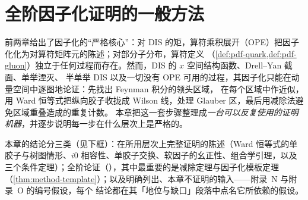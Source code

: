 \chapter{全阶因子化证明的一般方法}\label{ch:method}

前两章给出了因子化的“严格核心”：对 DIS 的矩，算符乘积展开（OPE）把因子化化为对算符矩阵元的陈述；对部分子分布，算符定义
（\cref{def:pdf-quark,def:pdf-gluon}）独立于任何过程而存在。然而，DIS 的 $x$ 空间结构函数、Drell--Yan 截面、单举湮灭、
半单举 DIS 以及一切没有 OPE 可用的过程，其因子化只能在动量空间中逐图地论证：先找出 Feynman 积分的领头区域，
在每个区域中作近似，用 Ward 恒等式把纵向胶子收拢成 Wilson 线，处理 Glauber 区，最后用减除法避免区域重叠造成的重复计数。
本章把这一套步骤整理成\emph{一台可以反复使用的证明机器}，并逐步说明每一步在什么层次上是严格的。

本章的结论分三类（见下框）：在所用层次上完整证明的陈述（Ward 恒等式的单胶子与树图情形、$i0$ 相容性、单胶子交换、软因子的幺正性、组合学引理，以及三个条件定理）；全阶论证（\tagA），其中最重要的是减除定理与因子化模板定理（\cref{thm:method-template}）；以及明确列出、本章不证明的输入——附录~N 与附录~O 的编号假设，每个 \tagA 结论都在其「地位与缺口」段落中点名它所依赖的假设。


